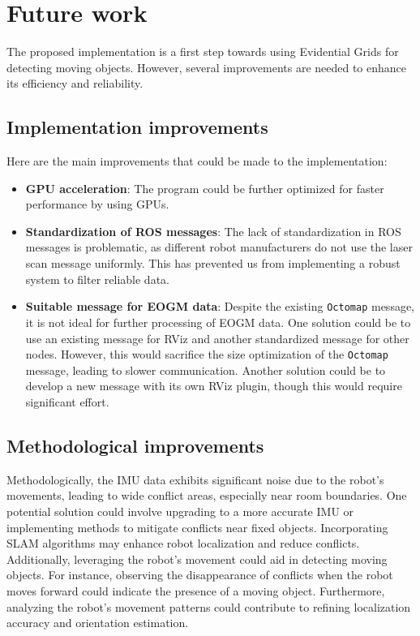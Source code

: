 \section{Future work}

The proposed implementation is a first step towards using Evidential Grids for detecting moving objects.
However, several improvements are needed to enhance its efficiency and reliability.

\subsection{Implementation improvements}

Here are the main improvements that could be made to the implementation:

\begin{itemize}
    \item \textbf{GPU acceleration}: The program could be further optimized for faster performance by using GPUs.
    \item \textbf{Standardization of ROS messages}: The lack of standardization in ROS messages is problematic, as different robot manufacturers do not use the laser scan message uniformly.
          This has prevented us from implementing a robust system to filter reliable data.
    \item \textbf{Suitable message for EOGM data}: Despite the existing \texttt{Octomap} message, it is not ideal for further processing of EOGM data.
          One solution could be to use an existing message for RViz and another standardized message for other nodes.
          However, this would sacrifice the size optimization of the \texttt{Octomap} message, leading to slower communication.
          Another solution could be to develop a new message with its own RViz plugin, though this would require significant effort.
\end{itemize}

\subsection{Methodological improvements}

Methodologically, the IMU data exhibits significant noise due to the robot's movements, leading to wide conflict areas, especially near room boundaries.
One potential solution could involve upgrading to a more accurate IMU or implementing methods to mitigate conflicts near fixed objects.
Incorporating SLAM algorithms may enhance robot localization and reduce conflicts.
Additionally, leveraging the robot's movement could aid in detecting moving objects.
For instance, observing the disappearance of conflicts when the robot moves forward could indicate the presence of a moving object.
Furthermore, analyzing the robot's movement patterns could contribute to refining localization accuracy and orientation estimation.